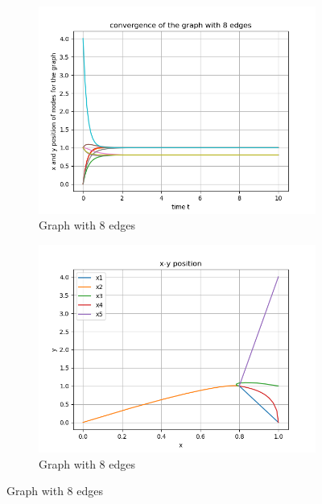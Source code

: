 \documentclass{article}
\begin{document}
\begin{problem}
\begin{figure}
\begin{subfigure}{0.4\textwidth}
            \includegraphics[width=\textwidth]{./img/p3_edge_8_1.png}
            \caption{Graph with 8 edges}
        \end{subfigure}
        \begin{subfigure}{0.4\textwidth}
            \includegraphics[width=\textwidth]{./img/p3_edge_8_2.png}
            \caption{Graph with 8 edges}
        \end{subfigure}
    \end{figure}
    \begin{figure}
        \centering
        \begin{subfigure}{0.4\textwidth}

\end{subfigure}
\end{figure}
\end{problem}
\end{document}
